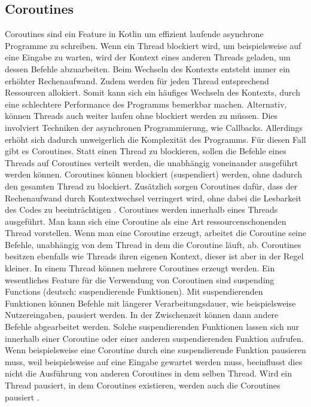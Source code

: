 \documentclass{article}
\begin{document}
\subsection{Coroutines}
Coroutines sind ein Feature in Kotlin um effizient laufende asynchrone Programme zu schreiben. Wenn ein Thread blockiert wird, um beispielsweise auf eine Eingabe zu warten, wird der Kontext eines anderen Threads geladen, um dessen Befehle abzuarbeiten. Beim Wechseln des Kontexts entsteht immer ein erhöhter Rechenaufwand. Zudem werden für jeden Thread entsprechend Ressourcen allokiert. Somit kann sich ein häufiges Wechseln des Kontexts, durch eine schlechtere Performance des Programms bemerkbar machen. Alternativ, können Threads auch weiter laufen ohne blockiert werden zu müssen. Dies involviert Techniken der asynchronen Programmierung, wie Callbacks. Allerdings erhöht sich dadurch unweigerlich die Komplexität des Programms. Für diesen Fall gibt es Coroutines. Statt einen Thread zu blockieren, sollen die Befehle eines Threads auf Coroutines verteilt werden, die unabhängig voneinander ausgeführt werden können. Coroutines können blockiert (suspendiert) werden, ohne dadurch den gesamten Thread zu blockiert. Zusätzlich sorgen Coroutines dafür, dass der Rechenaufwand durch Kontextwechsel verringert wird, ohne dabei die Lesbarkeit des Codes zu beeinträchtigen \cite{Kotlin_In-D}. \newline
Coroutines werden innerhalb eines Threads ausgeführt. Man kann sich eine Coroutine als eine Art ressourcenschonenden Thread vorstellen. Wenn man eine Coroutine erzeugt, arbeitet die Coroutine seine Befehle, unabhängig von dem Thread in dem die Coroutine läuft, ab. Coroutines besitzen ebenfalls wie Threads ihren eigenen Kontext, dieser ist aber in der Regel kleiner. In einem Thread können mehrere Coroutines erzeugt werden.  Ein wesentliches Feature für die Verwendung von Coroutinen sind suspending Functions (deutsch: suspendierende Funktionen). Mit suspendierenden Funktionen können Befehle mit längerer Verarbeitungsdauer, wie beispielsweise Nutzereingaben, pausiert werden. In der Zwischenzeit können dann andere Befehle abgearbeitet werden. Solche suspendierenden Funktionen lassen sich nur innerhalb einer Coroutine oder einer anderen suspendierenden Funktion aufrufen. Wenn beispielsweise eine Coroutine durch eine suspendierende Funktion pausieren muss, weil beispielsweise auf eine Eingabe gewartet werden muss, beeinflusst dies nicht die Ausführung von anderen Coroutines in dem selben Thread.  Wird ein Thread pausiert, in dem Coroutines existieren, werden auch die Coroutines pausiert \cite{KotlinLangDocCoroutines}. \newline
\end{document}
